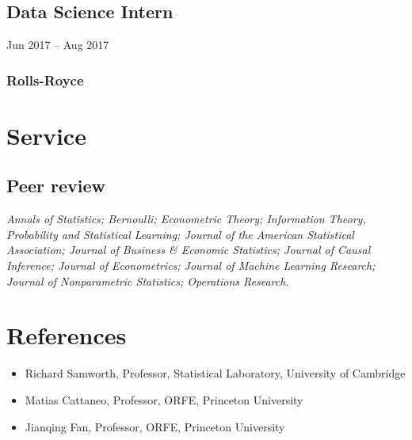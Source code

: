 \documentclass{wgu-cv}
\begin{document}
\subsection{Data Science Intern}
{Jun 2017 -- Aug 2017}
\subsubsection{Rolls-Royce}

\section{Service}

\subsection{Peer review}{}

\emph{%
  Annals of Statistics;
  Bernoulli;
  Econometric Theory;
  Information Theory, Probability and Statistical Learning;
  Journal of the American Statistical Association;
  Journal of Business \& Economic Statistics;
  Journal of Causal Inference;
  Journal of Econometrics;
  Journal of Machine Learning Research;
  Journal of Nonparametric Statistics;
  Operations Research.
}

\section{References}
\vspace{-0.22cm}

\begin{itemize}

  \item
    Richard Samworth,
    Professor,
    Statistical Laboratory,
    University of Cambridge

  \item
    Matias Cattaneo,
    Professor,
    ORFE,
    Princeton University

  \item
    Jianqing Fan,
    Professor,
    ORFE,
    Princeton University

\end{itemize}
\end{document}
